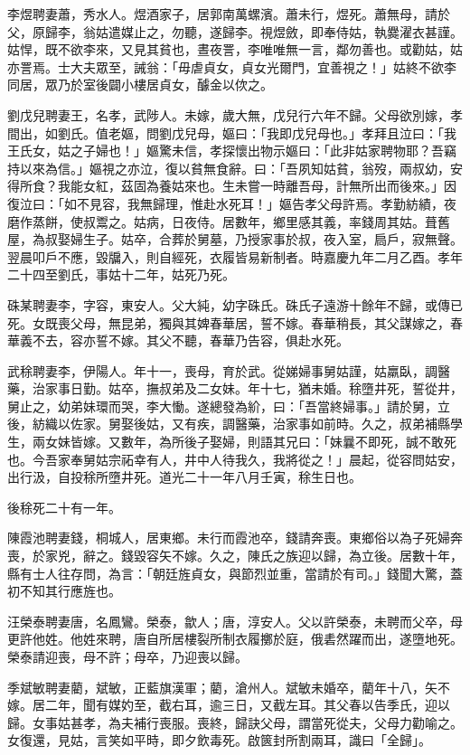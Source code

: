 \begin{pinyinscope}
李煜聘妻蕭，秀水人。煜酒家子，居郭南萬螺濱。蕭未行，煜死。蕭無母，請於父，原歸李，翁姑遣媒止之，勿聽，遂歸李。視煜斂，即奉侍姑，執爨濯衣甚謹。姑悍，既不欲李來，又見其貧也，晝夜詈，李唯唯無一言，鄰勿善也。或勸姑，姑亦詈焉。士大夫眾至，誡翁：「毋虐貞女，貞女光爾門，宜善視之！」姑終不欲李同居，眾乃於室後闢小樓居貞女，醵金以佽之。

劉戊兒聘妻王，名孝，武陟人。未嫁，歲大無，戊兒行六年不歸。父母欲別嫁，孝間出，如劉氏。值老嫗，問劉戊兒母，嫗曰：「我即戊兒母也。」孝拜且泣曰：「我王氏女，姑之子婦也！」嫗驚未信，孝探懷出物示嫗曰：「此非姑家聘物耶？吾竊持以來為信。」嫗視之亦泣，復以貧無食辭。曰：「吾夙知姑貧，翁歿，兩叔幼，安得所食？我能女紅，茲固為養姑來也。生未嘗一時離吾母，計無所出而後來。」因復泣曰：「如不見容，我無歸理，惟赴水死耳！」嫗告孝父母許焉。孝勤紡績，夜磨作蒸餅，使叔鬻之。姑病，日夜侍。居數年，鄉里感其義，率錢周其姑。葺舊屋，為叔娶婦生子。姑卒，合葬於舅墓，乃授家事於叔，夜入室，扃戶，寂無聲。翌晨叩戶不應，毀牖入，則自經死，衣履皆易新制者。時嘉慶九年二月乙酉。孝年二十四至劉氏，事姑十二年，姑死乃死。

硃某聘妻李，字容，東安人。父大純，幼字硃氏。硃氏子遠游十餘年不歸，或傳已死。女既喪父母，無昆弟，獨與其婢春華居，誓不嫁。春華稍長，其父謀嫁之，春華義不去，容亦誓不嫁。其父不聽，春華乃告容，俱赴水死。

武稌聘妻李，伊陽人。年十一，喪母，育於武。從娣婦事舅姑謹，姑羸臥，調醫藥，治家事日勤。姑卒，撫叔弟及二女妹。年十七，猶未婚。稌墮井死，誓從井，舅止之，幼弟妹環而哭，李大慟。遂總發為紒，曰：「吾當終婦事。」請於舅，立後，紡織以佐家。舅娶後姑，又有疾，調醫藥，治家事如前時。久之，叔弟補縣學生，兩女妹皆嫁。又數年，為所後子娶婦，則語其兄曰：「妹曩不即死，誠不敢死也。今吾家奉舅姑宗祏幸有人，井中人待我久，我將從之！」晨起，從容問姑安，出行汲，自投稌所墮井死。道光二十一年八月壬寅，稌生日也。

後稌死二十有一年。

陳霞池聘妻錢，桐城人，居東鄉。未行而霞池卒，錢請奔喪。東鄉俗以為子死婦奔喪，於家兇，辭之。錢毀容矢不嫁。久之，陳氏之族迎以歸，為立後。居數十年，縣有士人往存問，為言：「朝廷旌貞女，與節烈並重，當請於有司。」錢聞大驚，蓋初不知其行應旌也。

汪榮泰聘妻唐，名鳳鸞。榮泰，歙人；唐，淳安人。父以許榮泰，未聘而父卒，母更許他姓。他姓來聘，唐自所居樓裂所制衣履擲於庭，俄砉然躍而出，遂墮地死。榮泰請迎喪，母不許；母卒，乃迎喪以歸。

季斌敏聘妻藺，斌敏，正藍旗漢軍；藺，滄州人。斌敏未婚卒，藺年十八，矢不嫁。居二年，聞有媒妁至，截右耳，逾三日，又截左耳。其父春以告季氏，迎以歸。女事姑甚孝，為夫補行喪服。喪終，歸訣父母，謂當死從夫，父母力勸喻之。女復還，見姑，言笑如平時，即夕飲毒死。啟篋封所割兩耳，識曰「全歸」。


\end{pinyinscope}
